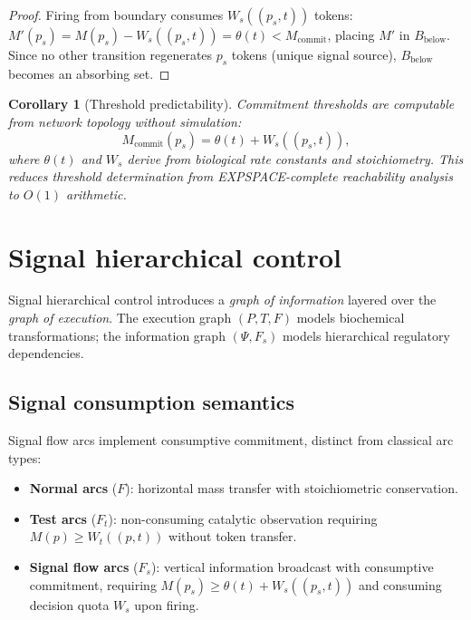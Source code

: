 \documentclass[11pt,a4paper]{article}
\theoremstyle{plain}
\newtheorem{corollary}[theorem]{Corollary}
\theoremstyle{definition}
\begin{document}
\begin{proof}
Firing from boundary consumes $W_s((p_s,t))$ tokens: $M'(p_s) = M(p_s) - W_s((p_s,t)) = \theta(t) < M_{\mathrm{commit}}$, placing $M'$ in $B_{\mathrm{below}}$. Since no other transition regenerates $p_s$ tokens (unique signal source), $B_{\mathrm{below}}$ becomes an absorbing set.
\end{proof}

\begin{corollary}[Threshold predictability]\label{cor:threshold}
Commitment thresholds are computable from network topology without simulation:
\begin{equation}\label{eq:threshold}
M_{\mathrm{commit}}(p_s) = \theta(t) + W_s((p_s,t)),
\end{equation}
where $\theta(t)$ and $W_s$ derive from biological rate constants and stoichiometry. This reduces threshold determination from EXPSPACE-complete reachability analysis to $O(1)$ arithmetic.
\end{corollary}


\section{Signal hierarchical control}

Signal hierarchical control introduces a \emph{graph of information} layered over the \emph{graph of execution}. The execution graph $(P, T, F)$ models biochemical transformations; the information graph $(\Psi, F_s)$ models hierarchical regulatory dependencies.

\subsection{Signal consumption semantics}

Signal flow arcs implement consumptive commitment, distinct from classical arc types:

\begin{itemize}
\item \textbf{Normal arcs} ($F$): horizontal mass transfer with stoichiometric conservation.
\item \textbf{Test arcs} ($F_t$): non-consuming catalytic observation requiring $M(p) \geq W_t((p,t))$ without token transfer.
\item \textbf{Signal flow arcs} ($F_s$): vertical information broadcast with consumptive commitment, requiring $M(p_s) \geq \theta(t) + W_s((p_s,t))$ and consuming decision quota $W_s$ upon firing.
\end{itemize}
\end{document}
